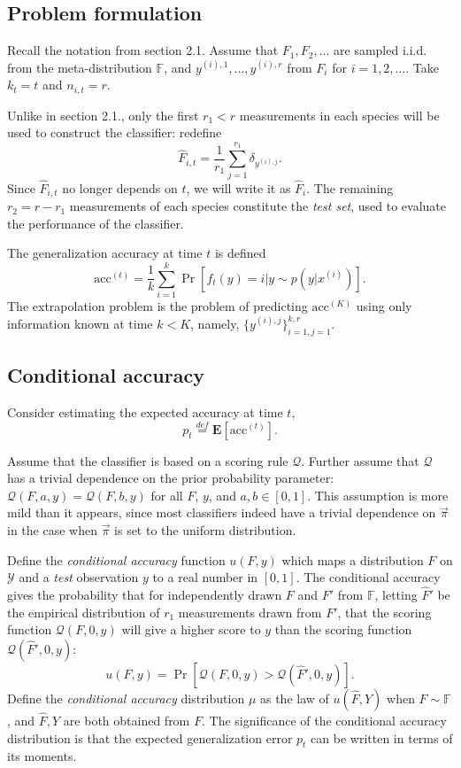 \documentclass{article}
\newcommand{\E}{\textbf{E}}
\begin{document}
\subsection{Problem formulation}

Recall the notation from section 2.1. Assume that $F_1,F_2, \hdots$
are sampled i.i.d. from the meta-distribution $\mathbb{F}$, and
$y^{(i), 1}, \hdots, y^{(i), r}$ from $F_i$ for $i = 1, 2, \hdots$.
Take $k_t = t$ and $n_{i, t} = r$.

Unlike in section 2.1., only the first $r_1 < r$ measurements in each
species will be used to construct the classifier: redefine
\[
\hat{F}_{i, t} = \frac{1}{r_1} \sum_{j=1}^{r_1} \delta_{y^{(i), j}}.
\]
Since $\hat{F}_{i, t}$ no longer depends on $t$, we will write it as
$\hat{F}_i$.  The remaining $r_2 = r - r_1$ measurements of each
species constitute the \emph{test set}, used to evaluate the
performance of the classifier.

The generalization accuracy at time $t$ is defined
\[
\text{acc}^{(t)} = \frac{1}{k}\sum_{i=1}^k \Pr[f_t(y) = i|y \sim p(y|x^{(i)})].
\]
The extrapolation problem is the problem of predicting
$\text{acc}^{(K)}$ using only information known at time $k < K$,
namely, $\{y^{(i), j}\}_{i=1, j=1}^{k, r}$.

\subsection{Conditional accuracy}

Consider estimating the expected accuracy at time $t$, \[p_t
\stackrel{def}{=} \E[\text{acc}^{(t)}].\]

Assume that the classifier is based on a scoring rule $\mathcal{Q}$.
Further assume that $\mathcal{Q}$ has a trivial dependence on the
prior probability parameter: $\mathcal{Q}(F, a, y) = \mathcal{Q}(F, b,
y)$ for all $F$, $y$, and $a, b \in [0, 1]$.  This assumption is more
mild than it appears, since most classifiers indeed have a trivial
dependence on $\vec{\pi}$ in the case when $\vec{\pi}$ is set to the
uniform distribution.

Define the \emph{conditional accuracy} function $u(F, y)$ which maps a
distribution $F$ on $\mathcal{Y}$ and a \emph{test} observation $y$ to
a real number in $[0,1]$.  The conditional accuracy gives the
probability that for independently drawn $F$ and $F'$ from
$\mathbb{F}$, letting $\hat{F}'$ be the empirical distribution of
$r_1$ measurements drawn from $F'$, that the scoring function
$\mathcal{Q}(F, 0, y)$ will give a higher score to $y$ than the
scoring function $\mathcal{Q}(\hat{F}', 0, y)$:
\[
u(F, y) = \Pr[\mathcal{Q}(F, 0, y) > \mathcal{Q}(\hat{F}', 0, y)].
\]
Define the \emph{conditional accuracy} distribution $\mu$ as the law
of $u(\hat{F}, Y)$ when $F \sim \mathbb{F}$, and $\hat{F}, Y$ are both
obtained from $F$.  The significance of the conditional accuracy
distribution is that the expected generalization error $p_t$ can be
written in terms of its moments.
\end{document}
